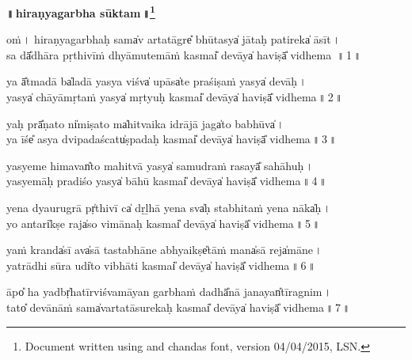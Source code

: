 \documentclass[parskip, DIV=14]{scrartcl}
\renewcommand{\thefootnote}{\fnsymbol{footnote}} %
\begin{document}

\vspace{-1.5cm}

\begin{center}
\textbf{{\Huge॥\,hiraṇyagarbha sūktam\,॥\LARGE\let\thefootnote\relax\footnote{\color{lightgray} Document written using \XeLaTeX{} and chandas font, version 04/04/2015, LSN.}}}
\end{center}
\large

\centering	

\vspace{0.5cm}

oṁ\,। hi॒ra॒ṇya॒ga॒rbhaḥ sama̍v	arta॒tāgre̎ bhū॒tasya̍ jā॒taḥ pati॒reka̍ āsīt\,। \\
sa dā̎dhāra pṛthi॒vīṁ dhyāmu॒temāṁ kasmai̎ de॒vāya̍ ha॒viṣā̎ vidhema \,॥\,1\,॥ \par 

ya ā̎tma॒dā ba̍la॒dā yasya॒ viśva̍ u॒pāsa̍te pra॒śiṣa॒ṁ yasya̍ de॒vāḥ\,। \\
yasya̍ chā॒yāmṛta॒ṁ yasya̍ mṛ॒tyuḥ kasmai̎ de॒vāya̍ ha॒viṣā̎ vidhema\,॥\,2\,॥ \par 

yaḥ prā̎ṇa॒to ni̍miṣa॒to ma̍hi॒tvaika॒ idrājā॒ jaga̍to ba॒bhūva̍\,। \\
ya īśe̎ a॒sya dvi॒pada॒ścatu̍ṣpada॒ḥ kasmai̎ de॒vāya̍ ha॒viṣā̎ vidhema\,॥\,3\,॥ \par 

yasye॒me hi॒mavan̎to mahi॒tvā yasya̍ samu॒draṁ ra॒sayā̎ sa॒hāhuḥ\,। \\
yasye॒māḥ pra॒diśo॒ yasya̍ bā॒hū kasmai̎ de॒vāya̍ ha॒viṣā̎ vidhema\,॥\,4\,॥ \par 

yena॒ dyauru॒grā pṛ̍thi॒vī ca̍ dṛ॒ḻhā yena॒ sva̍ḥ stabhi॒taṁ yena॒ nāka̍ḥ\,। \\
yo a॒ntari̍kṣe॒ raja̍so vi॒māna॒ḥ kasmai̎ de॒vāya̍ ha॒viṣā̎ vidhema\,॥\,5\,॥ \par 

yaṁ kranda̍sī॒ ava̍sā tastabhā॒ne a॒bhyaikṣe̎tā॒ṁ mana̍sā॒ reja̍māne\,। \\
yatrādhi॒ sūra॒ udi̍to vi॒bhāti॒ kasmai̎ de॒vāya̍ ha॒viṣā̎ vidhema\,॥\,6\,॥ \par 

āpo̎ ha॒ yadbṛ̍ha॒tīrvi॒śvamāya॒n garbha॒ṁ dadhā̎nā ja॒nayan̎tīra॒gnim\,। \\
tato̎ de॒vānā॒ṁ sama̍varta॒tāsu॒reka॒ḥ kasmai̎ de॒vāya̍ ha॒viṣā̎ vidhema\,॥\,7\,॥ \par 
\end{document}
